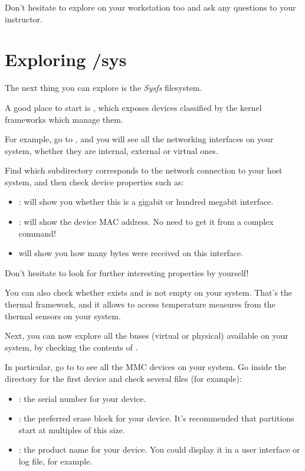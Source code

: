 Don't hesitate to explore  on your workstation too
and ask any questions to your instructor.

\section{Exploring /sys}

The next thing you can explore is the {\em Sysfs} filesystem.

A good place to start is , which exposes devices
classified by the kernel frameworks which manage them.

For example, go to , and you will see all the
networking interfaces on your system, whether they are internal,
external or virtual ones.

Find which subdirectory corresponds to the network connection
to your host system, and then check device properties such as:
\begin{itemize}
   \item {}: will show you whether this is a gigabit
         or hundred megabit interface.
   \item {}: will show the device MAC address. No
	 need to get it from a complex command!
   \item {} will show you how many bytes
	 were received on this interface.
\end{itemize}

Don't hesitate to look for further interesting properties by yourself!

You can also check whether  exists and is not
empty on your system. That's the thermal framework, and it allows
to access temperature measures from the thermal sensors on your system.

Next, you can now explore all the buses (virtual or physical) available
on your system, by checking the contents of .

In particular, go to  to see all the
MMC devices on your system. Go inside the directory for the first device
and check several files (for example):

\begin{itemize}
\item {}: the serial number for your device.
\item {}: the preferred erase block for your
      device. It's recommended that partitions start at multiples of this
      size.
\item {}: the product name for your device. You could display
      it in a user interface or log file, for example.
\end{itemize}


